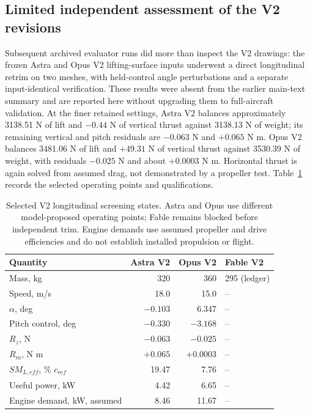 \documentclass[11pt,a4paper]{article}
\begin{document}
\subsection{Limited independent assessment of the V2 revisions}
Subsequent archived evaluator runs did more than inspect the V2 drawings: the frozen Astra and Opus V2 lifting-surface inputs underwent a direct longitudinal retrim on two meshes, with held-control angle perturbations and a separate input-identical verification. These results were absent from the earlier main-text summary and are reported here without upgrading them to full-aircraft validation. At the finer retained settings, Astra V2 balances approximately 3138.51 N of lift and $-0.44$ N of vertical thrust against 3138.13 N of weight; its remaining vertical and pitch residuals are $-0.063$ N and $+0.065$ N m. Opus V2 balances 3481.06 N of lift and $+49.31$ N of vertical thrust against 3530.39 N of weight, with residuals $-0.025$ N and about $+0.0003$ N m. Horizontal thrust is again solved from assumed drag, not demonstrated by a propeller test. Table~\ref{tab:v2} records the selected operating points and qualifications.

\begin{table}[H]\centering\small
\caption{Selected V2 longitudinal screening states. Astra and Opus use different model-proposed operating points; Fable remains blocked before independent trim. Engine demands use assumed propeller and drive efficiencies and do not establish installed propulsion or flight.}\label{tab:v2}
\begin{tabular}{lrrl}\toprule
Quantity & Astra V2 & Opus V2 & Fable V2\\\midrule
Mass, kg & 320 & 360 & 295 (ledger)\\
Speed, m/s & 18.0 & 15.0 & --\\
$\alpha$, deg & $-0.103$ & 6.347 & --\\
Pitch control, deg & $-0.330$ & $-3.168$ & --\\
$R_z$, N & $-0.063$ & $-0.025$ & --\\
$R_m$, N m & $+0.065$ & $+0.0003$ & --\\
$SM_{L,eff}$, \% $c_{ref}$ & 19.47 & 7.76 & --\\
Useful power, kW & 4.42 & 6.65 & --\\
Engine demand, kW, assumed & 8.46 & 11.67 & --\\\bottomrule
\end{tabular}
\end{table}
\end{document}

